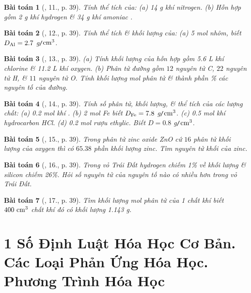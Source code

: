 \documentclass{article}
\newtheorem{baitoan}{Bài toán}
\begin{document}
\begin{baitoan}[\cite{An_Hoa_Hoc_nang_cao_8_9}, 11., p. 39]
	Tính thể tích của: (a) {\rm14 g} khí nitrogen. (b) Hỗn hợp gồm {\rm2 g} khí hydrogen \& {\rm34 g} khí amoniac {\rm{}}.
\end{baitoan}

\begin{baitoan}[\cite{An_Hoa_Hoc_nang_cao_8_9}, 12., p. 39]
	Tính thể tích \& khối lượng của: (a) {\rm5 mol} nhôm, biết $D_{\rm Al} = 2.7$ {\rm g{\tt/}$\rm cm^3$}.
\end{baitoan}

\begin{baitoan}[\cite{An_Hoa_Hoc_nang_cao_8_9}, 13., p. 39]
	(a) Tính khối lượng của hỗn hợp gồm {\rm5.6 L} khí chlorine \& {\rm11.2 L} khí oxygen. (b) Phân tử đường gồm $12$ nguyên tử {\rm C}, $22$ nguyên tử {\rm H}, \& $11$ nguyên tử {\rm O}. Tính khối lượng mol phân tử \& thành phần {\rm\%} các nguyên tố của đường.
\end{baitoan}

\begin{baitoan}[\cite{An_Hoa_Hoc_nang_cao_8_9}, 14., p. 39]
	Tính số phân tử, khối lượng, \& thể tích của các lượng chất: (a) {\rm0.2 mol} khí {\rm{}}. (b) {\rm2 mol Fe} biết $D_{\rm Fe} = 7.8$ {\rm g{\tt/}$\rm cm^3$}. (c) {\rm0.5 mol} khí hydrocarbon {\rm HCl}. (d) {\rm0.2 mol} rượu ethylic. Biết $D = 0.8$ {\rm g{\tt/}$\rm cm^3$}.
\end{baitoan}

\begin{baitoan}[\cite{An_Hoa_Hoc_nang_cao_8_9}, 15., p. 39]
	Trong phân tử zinc oxide {\rm ZnO} cứ $16$ phân tử khối lượng của oxygen thì có $65.38$ phần khối lượng zinc. Tìm nguyên tử khối của zinc.
\end{baitoan}

\begin{baitoan}[\cite{An_Hoa_Hoc_nang_cao_8_9}, 16., p. 39]
	Trong vỏ Trái Đất hydrogen chiếm {\rm1\%} về khối lượng \& silicon chiếm {\rm26\%}. Hỏi số nguyên tử của nguyên tố nào có nhiều hơn trong vỏ Trái Đất.
\end{baitoan}

\begin{baitoan}[\cite{An_Hoa_Hoc_nang_cao_8_9}, 17., p. 39]
	Tìm khối lượng mol phân tử của 1 chất khí biết $\rm400\ cm^3$ chất khí đó có khối lượng {\rm1.143 g}.
\end{baitoan}


\section{1 Số Định Luật Hóa Học Cơ Bản. Các Loại Phản Ứng Hóa Học. Phương Trình Hóa Học}


\printbibliography[heading=bibintoc]
\end{document}
